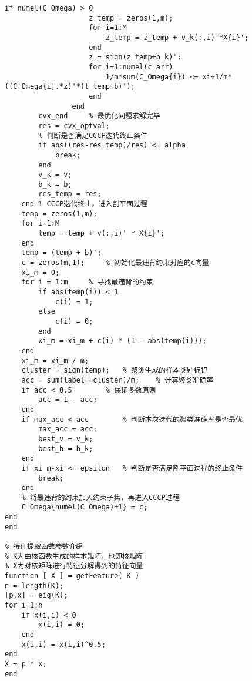 \begin{lstlisting}[basicstyle=\small\menlo]
                if numel(C_Omega) > 0
                    z_temp = zeros(1,m);
                    for i=1:M
                        z_temp = z_temp + v_k(:,i)'*X{i}';
                    end
                    z = sign(z_temp+b_k)';
                    for i=1:numel(c_arr)
                        1/m*sum(C_Omega{i}) <= xi+1/m*((C_Omega{i}.*z)'*(l_temp+b)');
                    end
                end
        cvx_end		% 最优化问题求解完毕
        res = cvx_optval;
        % 判断是否满足CCCP迭代终止条件
        if abs((res-res_temp)/res) <= alpha
            break;
        end
        v_k = v;
        b_k = b;
        res_temp = res;
    end	% CCCP迭代终止，进入割平面过程
    temp = zeros(1,m);
    for i=1:M
        temp = temp + v(:,i)' * X{i}';
    end
    temp = (temp + b)';
    c = zeros(m,1);     % 初始化最违背约束对应的c向量
    xi_m = 0;
    for i = 1:m     % 寻找最违背的约束
        if abs(temp(i)) < 1
            c(i) = 1;
        else
            c(i) = 0;
        end
        xi_m = xi_m + c(i) * (1 - abs(temp(i)));
    end
    xi_m = xi_m / m;
    cluster = sign(temp);	% 聚类生成的样本类别标记
    acc = sum(label==cluster)/m;	% 计算聚类准确率
    if acc < 0.5		% 保证多数原则
        acc = 1 - acc;
    end
    if max_acc < acc		% 判断本次迭代的聚类准确率是否最优
        max_acc = acc;
        best_v = v_k;
        best_b = b_k;
    end
    if xi_m-xi <= epsilon	% 判断是否满足割平面过程的终止条件
        break;
    end
    % 将最违背的约束加入约束子集，再进入CCCP过程
    C_Omega{numel(C_Omega)+1} = c;
end
end

% 特征提取函数参数介绍
% K为由核函数生成的样本矩阵，也即核矩阵
% X为对核矩阵进行特征分解得到的特征向量
function [ X ] = getFeature( K )
n = length(K);
[p,x] = eig(K);
for i=1:n
    if x(i,i) < 0
        x(i,i) = 0;
    end
    x(i,i) = x(i,i)^0.5;
end
X = p * x;
end
\end{lstlisting}